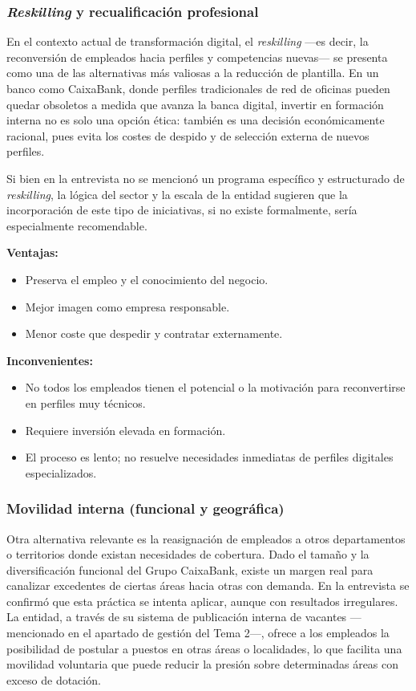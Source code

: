 \subsubsection{\textit{Reskilling} y recualificación profesional}

En el contexto actual de transformación digital, el \textit{reskilling}
---es decir, la reconversión de empleados hacia perfiles y competencias
nuevas--- se presenta como una de las alternativas más valiosas a la
reducción de plantilla. En un banco como CaixaBank, donde perfiles
tradicionales de red de oficinas pueden quedar obsoletos a medida que
avanza la banca digital, invertir en formación interna no es solo una
opción ética: también es una decisión económicamente racional, pues evita
los costes de despido y de selección externa de nuevos perfiles.

Si bien en la entrevista no se mencionó un programa específico y estructurado
de \textit{reskilling}, la lógica del sector y la escala de la entidad
sugieren que la incorporación de este tipo de iniciativas, si no existe
formalmente, sería especialmente recomendable.

\textbf{Ventajas:}
\begin{itemize}
  \item Preserva el empleo y el conocimiento del negocio.
  \item Mejor imagen como empresa responsable.
  \item Menor coste que despedir y contratar externamente.
\end{itemize}

\textbf{Inconvenientes:}
\begin{itemize}
  \item No todos los empleados tienen el potencial o la motivación para
        reconvertirse en perfiles muy técnicos.
  \item Requiere inversión elevada en formación.
  \item El proceso es lento; no resuelve necesidades inmediatas de
        perfiles digitales especializados.
\end{itemize}

\subsubsection{Movilidad interna (funcional y geográfica)}

Otra alternativa relevante es la reasignación de empleados a otros
departamentos o territorios donde existan necesidades de cobertura. Dado
el tamaño y la diversificación funcional del Grupo CaixaBank, existe un
margen real para canalizar excedentes de ciertas áreas hacia otras con
demanda. En la entrevista se confirmó que esta práctica se intenta aplicar,
aunque con resultados irregulares. La entidad, a través de su sistema
de publicación interna de vacantes ---mencionado en el apartado de gestión
del Tema 2---, ofrece a los empleados la posibilidad de postular a puestos
en otras áreas o localidades, lo que facilita una movilidad voluntaria
que puede reducir la presión sobre determinadas áreas con exceso de dotación.


